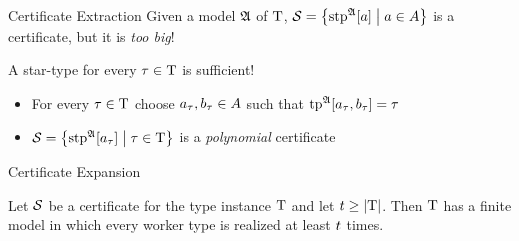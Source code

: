 \documentclass{beamer}
\begin{document}
\begin{frame}{Certificate Extraction}
Given a model $\mathfrak{A}$ of $\mathrm{T}$, $\mathcal{S} = \left\{\operatorname{stp}^{\mathfrak{A}}[a]\mathrel{}\middle|\mathrel{}a\in A\right\}$ is
a certificate, but it is \emph{too big}!
\pause

A star-type for every $\tau\in\mathrm{T}$ is sufficient!
\begin{itemize}
  \item For every $\tau\in\mathrm{T}$ choose $a_{\tau},b_{\tau}\in A$ such that
$\operatorname{tp}^{\mathfrak{A}}[a_{\tau},b_{\tau}] = \tau$
  \item $\mathcal{S} = \left\{\operatorname{stp}^{\mathfrak{A}}[a_{\tau}]\mathrel{}\middle|\mathrel{}\tau\in\mathrm{T}\right\}$ is a
  \emph{polynomial} certificate
\end{itemize}
\end{frame}

\begin{frame}{Certificate Expansion}
\begin{theorem}
Let $\mathcal{S}$ be a certificate for the type instance $\mathrm{T}$ and let
$t\geq\left|\mathrm{T}\right|$.
Then $\mathrm{T}$ has a finite model in which every worker type is realized at least
$t$ times.
\end{theorem}
\end{frame}
\end{document}
